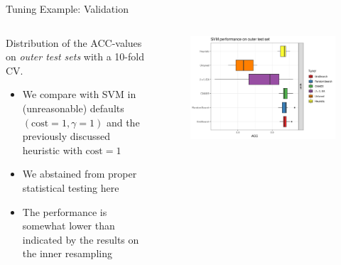 \begin{frame}{Tuning Example: Validation}

\begin{columns}
\begin{column}{0.4\textwidth}

  Distribution of the ACC-values on \emph{outer test sets} with a 10-fold CV.


  \begin{itemize}
      \item We compare with SVM in (unreasonable) defaults $(\text{cost}=1,\gamma=1)$ and the previously discussed heuristic with $\text{cost} = 1$
    \item We abstained from proper statistical testing here
    \item The performance is somewhat lower than indicated by the results on the inner resampling
  \end{itemize}

\end{column}
\begin{column}{0.6\textwidth}
  \vspace{-1em}
  \begin{figure}
  \includegraphics[width=\textwidth]{images/benchmark_boxplot_all.png}
  \end{figure}
\end{column}
\end{columns}
\end{frame}

